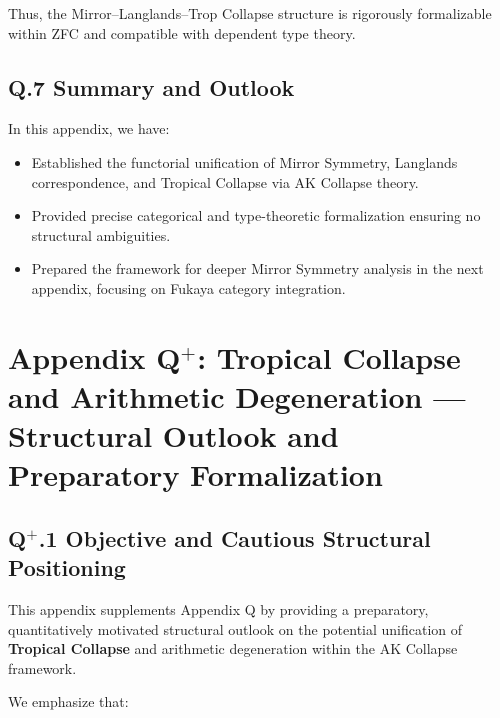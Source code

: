 \documentclass[11pt]{article}
\begin{document}
Thus, the Mirror–Langlands–Trop Collapse structure is rigorously formalizable within ZFC and compatible with dependent type theory.

\subsection*{Q.7 Summary and Outlook}

In this appendix, we have:

\begin{itemize}
  \item Established the functorial unification of Mirror Symmetry, Langlands correspondence, and Tropical Collapse via AK Collapse theory.
  \item Provided precise categorical and type-theoretic formalization ensuring no structural ambiguities.
  \item Prepared the framework for deeper Mirror Symmetry analysis in the next appendix, focusing on Fukaya category integration.
\end{itemize}




\section*{Appendix Q$^{+}$: Tropical Collapse and Arithmetic Degeneration — Structural Outlook and Preparatory Formalization}

\subsection*{Q$^{+}$.1 Objective and Cautious Structural Positioning}

This appendix supplements Appendix Q by providing a preparatory, quantitatively motivated structural outlook on the potential unification of \textbf{Tropical Collapse} and arithmetic degeneration within the AK Collapse framework.

We emphasize that:
\end{document}
